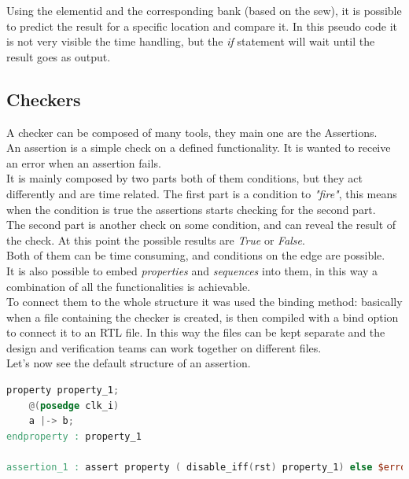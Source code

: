 \linespread{1.2}
\bigskip

Using the element\+id and the corresponding bank (based on the sew), it is possible to predict the result for a specific location and compare it. In this pseudo code it is not very visible the time handling, but the \emph{if} statement will wait until the result goes as output.


\subsection{Checkers}
A checker can be composed of many tools, they main one are the Assertions.\\

An assertion is a simple check on a defined functionality. It is wanted to receive an error when an assertion fails.\\
It is mainly composed by two parts both of them conditions, but they act differently and are time related. The first part is a condition to \textit{"fire"}, this means when the condition is true the assertions starts checking for the second part.\cite{verification-book-2016}\\

The second part is another check on some condition, and can reveal the result of the check. At this point the possible results are \textit{True} or \textit{False}.\\

Both of them can be time consuming, and conditions on the edge are possible.\\
It is also possible to embed \textit{properties} and \textit{sequences} into them, in this way  a combination of all the functionalities is achievable.\\

To connect them to the whole structure it was used the binding method: basically when a file containing the checker is created, is then compiled with a bind option to connect it to an RTL file. In this way the files can be kept separate and the design and verification teams can work together on different files. \cite{binding}\\

Let's now see the default structure of an assertion.
\bigskip

\linespread{1}
\begin{lstlisting}[language=Verilog,style=verilog-style, backgroundcolor=\color{lyel_palette}, frame=tlb]
property property_1;
    @(posedge clk_i)
	a |-> b;
endproperty : property_1

assertion_1 : assert property ( disable_iff(rst) property_1) else $error("")

\end{lstlisting}
\linespread{1.2}
\bigskip


